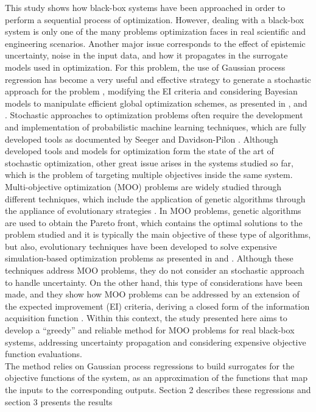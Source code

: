 \documentclass{article}
\begin{document}
This study shows how black-box systems have been approached in order to perform a sequential process of optimization. However, dealing with a black-box system is only one of the many problems optimization faces in real scientific and engineering scenarios. Another major issue corresponds to the effect of epistemic uncertainty, noise in the input data, and how it propagates in the surrogate models used in optimization. For this problem, the use of Gaussian process regression has become a very useful and effective strategy to generate a stochastic approach for the problem \cite{Wang2016}, modifying the EI criteria and considering Bayesian models to manipulate efficient global optimization schemes, as presented in \cite{Huang2006}, \cite{Pandita2016} and \cite{Li2014}. Stochastic approaches to optimization problems often require the development and implementation of probabilistic machine learning techniques, which are fully developed tools as documented by Seeger \cite{Seeger2004} and Davidson-Pilon \cite{Davidson-Pilon2014}. Although developed tools and models for optimization form the state of the art of stochastic optimization, other great issue arises in the systems studied so far, which is the problem of targeting multiple objectives inside the same system.\\

Multi-objective optimization (MOO) problems are widely studied through different techniques, which include the application of genetic algorithms through the appliance of evolutionary strategies \cite{Costa2006}. In MOO problems, genetic algorithms are used to obtain the Pareto front, which contains the optimal solutions to the problem studied and it is typically the main objective of these type of algorithms, but also, evolutionary techniques have been developed to solve expensive simulation-based optimization problems as presented in \cite{Guo2007} and \cite{Huang2009}. Although these techniques address MOO problems, they do not consider an stochastic approach to handle uncertainty. On the other hand, this type of considerations have been made, and they show how MOO problems can be addressed by an extension of the expected improvement (EI) criteria, deriving a closed form of the information acquisition function \cite{wagner2010expected}. Within this context, the study presented here aims to develop a ``greedy'' and reliable method for MOO problems for real black-box systems, addressing uncertainty propagation and considering expensive objective function evaluations.\\

The method relies on Gaussian process regressions to build surrogates for the objective functions of the system, as an approximation of the functions that map the inputs to the corresponding outputs. Section 2 describes these regressions and section 3 presents the results





\end{document}
